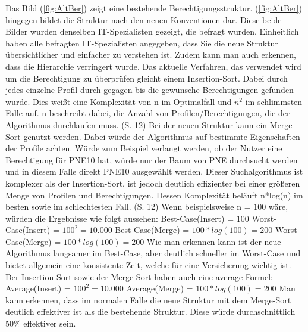\newpage
Das Bild (\ref{fig:AltBer}) zeigt eine bestehende Berechtigungsstruktur.
(\ref{fig:AltBer}) hingegen bildet die Struktur nach den neuen Konventionen dar.
Diese beide Bilder wurden denselben IT-Spezialisten gezeigt, die befragt wurden.
Einheitlich haben alle befragten IT-Spezialisten angegeben, dass Sie die neue Struktur übersichtlicher und einfacher zu verstehen ist.
Zudem kann man auch erkennen, dass die Hierarchie verringert wurde.
\newline
Das aktuelle Verfahren, das verwendet wird um die Berechtigung zu überprüfen gleicht einem Insertion-Sort.
Dabei durch jedes einzelne Profil durch gegagen bis die gewünsche Berechtigungen gefunden wurde.
Dies weißt eine Komplexität von n im Optimalfall und $n^2$ im schlimmsten Falle auf.
n beschreibt dabei, die Anzahl von Profilen/Berechtigungen, die der Algorithmus durchlaufen muss. \cite{weblogIn,log} (S. 12)
\newline
Bei der neuen Struktur kann ein Merge-Sort genutzt werden.
Dabei würde der Algorithmus auf bestimmte Eigenschaften der Profile achten.
Würde zum Beispiel verlangt werden, ob der Nutzer eine Berechtigung für PNE10 hat, würde nur der Baum von PNE durchsucht werden und in diesem Falle direkt PNE10 ausgewählt werden.
Dieser Suchalgorithmus ist komplexer als der Insertion-Sort, ist jedoch deutlich effizienter bei einer größeren Menge von Profilen und Berechtigungen.
Dessen Komplexität beläuft n*log(n) im besten sowie im schlechtesten Fall. \cite{weblogMer,log} (S. 12)
\newline
Wenn beispielsweise n = $100$ wäre, würden die Ergebnisse wie folgt aussehen:
\newline
\newline
Best-Case(Insert) = $100$
\newline
Worst-Case(Insert) = $100^2 = 10.000$
\newline
\newline
Best-Case(Merge) = $100*log(100) = 200$
\newline
Worst-Case(Merge) = $100*log(100) = 200$
\newline
\newline
Wie man erkennen kann ist der neue Algorithmus langsamer im Best-Case, aber deutlich schneller im Worst-Case und bietet allgemein eine konsistente Zeit, welche für eine Versicherung wichtig ist.
Der Insertion-Sort sowie der Merge-Sort haben auch eine average Formel: \cite{weblogMer,weblogIn}
\newline
\newline
Average(Insert) = $100^2 = 10.000$
\newline
\newline
Average(Merge) = $100*log(100) = 200$
\newline
\newline
Man kann erkennen, dass im normalen Falle die neue Struktur mit dem Merge-Sort deutlich effektiver ist als die bestehende Struktur.
Diese würde durchschnittlich 50\% effektiver sein.

